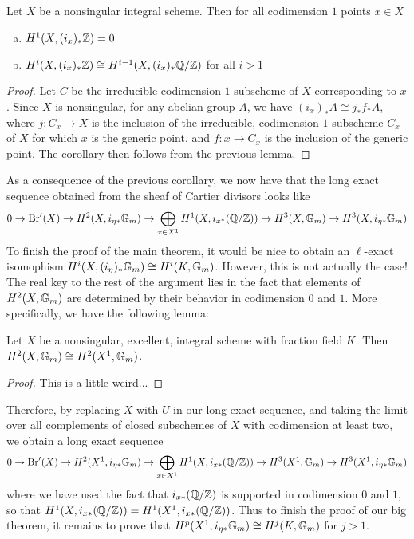 \begin{cor}
Let $X$ be a nonsingular integral scheme.  Then for all codimension $1$ points $x\in X$
\begin{enumerate}[(a)]
\item  $H^1(X,(i_x)_*\mathbb{Z}) = 0$
\item  $H^i(X,(i_x)_*\mathbb{Z}) \cong H^{i-1}(X,(i_x)_*\mathbb{Q}/\mathbb{Z})$ for all $i>1$
\end{enumerate}
\end{cor}
\begin{proof}
Let $C$ be the irreducible codimension $1$ subscheme of $X$ corresponding to $x$.  Since $X$ is nonsingular, for any abelian group $A$, we have $(i_x)_*A \cong j_*f_*A$, where $j: C_x\rightarrow X$ is the inclusion of the irreducible, codimension $1$ subscheme $C_x$ of $X$ for which $x$ is the generic point, and $f: x\rightarrow C_x$ is the inclusion of the generic point.  The corollary then follows from the previous lemma.
\end{proof}
As a consequence of the previous corollary, we now have that the long exact sequence obtained from the sheaf of Cartier divisors looks like
\begin{equation}\label{les form2}
0\rightarrow \textnormal{Br}'(X)\rightarrow H^2(X,i_{\eta*}\mathbb{G}_m)\rightarrow \bigoplus_{x\in X^1}H^1(X, i_{x^*}(\mathbb{Q}/\mathbb{Z}))\rightarrow H^3(X,\mathbb{G}_m)\rightarrow H^3(X,i_{\eta*}\mathbb{G}_m)
\end{equation}
To finish the proof of the main theorem, it would be nice to obtain an $\ell$-exact isomophism $H^i(X,(i_\eta)_*\mathbb{G}_m)\cong H^i(K,\mathbb{G}_m)$.  However, this is not actually the case!  The real key to the rest of the argument lies in the fact that elements of $H^2(X,\mathbb{G}_m)$ are determined by their behavior in codimension $0$ and $1$.  More specifically, we have the following lemma:
\begin{lem}
Let $X$ be a nonsingular, excellent, integral scheme with fraction field $K$.  Then $H^2(X,\mathbb{G}_m)\cong H^2(X^1,\mathbb{G}_m)$.
\end{lem}
\begin{proof}
This is a little weird...
\end{proof}
Therefore, by replacing $X$ with $U$ in our long exact sequence, and taking the limit over all complements of closed subschemes of $X$ with codimension at least two, we obtain a long exact sequence
\begin{equation}\label{les form3}
0\rightarrow \textnormal{Br}'(X)\rightarrow H^2(X^1,i_{\eta*}\mathbb{G}_m)\rightarrow \bigoplus_{x\in X^1}H^1(X, i_{x*}(\mathbb{Q}/\mathbb{Z}))\rightarrow H^3(X^1,\mathbb{G}_m)\rightarrow H^3(X^1,i_{\eta*}\mathbb{G}_m)
\end{equation}
where we have used the fact that $i_{x*}(\mathbb{Q}/\mathbb{Z})$ is supported in codimension $0$ and $1$, so that $H^1(X,i_{x*}(\mathbb{Q}/\mathbb{Z})) = H^1(X^1,i_{x*}(\mathbb{Q}/\mathbb{Z}))$.  Thus to finish the proof of our big theorem, it remains to prove that $H^p(X^1,i_{\eta*}\mathbb{G}_m)\cong H^j(K,\mathbb{G}_m)$ for $j>1$.


